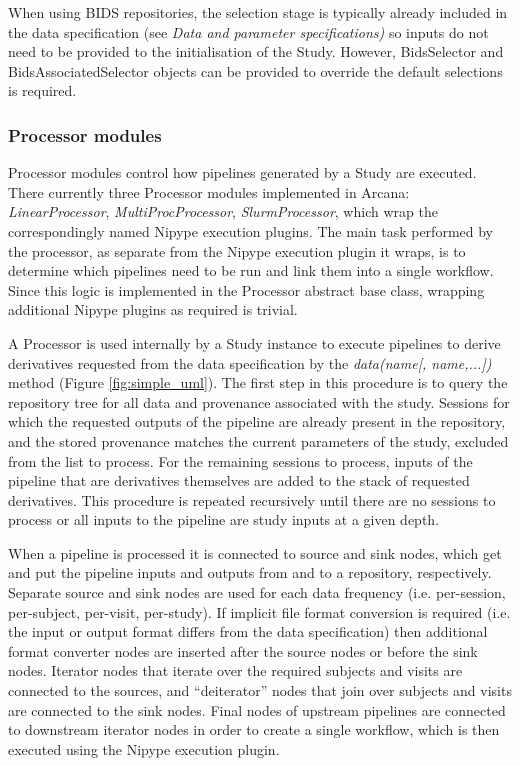 \documentclass[smallextended]{svjour3}       %
\begin{document}
When using BIDS repositories, the selection stage is typically already
included in the data specification (see \emph{Data and parameter
specifications)} so inputs do not need to be provided to the
initialisation of the Study. However, BidsSelector and
BidsAssociatedSelector objects can be provided to override the default
selections is required.

\subsubsection*{Processor modules}
\label{processor-modules}

Processor modules control how pipelines generated by a Study
are executed. There currently three Processor modules implemented in
Arcana: \emph{LinearProcessor}, \emph{MultiProcProcessor},
\emph{SlurmProcessor}, which wrap the
correspondingly named Nipype execution plugins. The main task performed
by the processor, as separate from the Nipype execution plugin it wraps,
is to determine which pipelines need to be run and link them into a
single workflow. Since this logic is implemented in the Processor
abstract base class, wrapping additional Nipype plugins as required is
trivial.

A Processor is used internally by a Study instance to execute pipelines
to derive derivatives requested from the data specification by the
\emph{data(name{[}, name,...{]})} method (Figure \ref{fig:simple_uml}). The first
step in this procedure is to query the repository tree for all data and
provenance associated with the study. Sessions for which the requested
outputs of the pipeline are already present in the repository, and the stored
provenance matches the current parameters of the study,
excluded from the list to process. For the remaining sessions to
process, inputs of the pipeline that are derivatives themselves are
added to the stack of requested derivatives. This procedure is repeated
recursively until there are no sessions to process or all inputs to the
pipeline are study inputs at a given depth.

When a pipeline is processed it is connected to source and
sink nodes, which get and put the pipeline inputs and outputs
from and to a repository, respectively. Separate source and sink nodes
are used for each data frequency (i.e. per-session, per-subject,
per-visit, per-study). If implicit file format conversion is required
(i.e. the input or output format differs from the data specification)
then additional format converter nodes are inserted after the source
nodes or before the sink nodes. Iterator nodes that iterate over the
required subjects and visits are connected to the sources, and ``deiterator''
nodes that join over subjects and visits are connected to the sink
nodes. Final nodes of upstream pipelines are connected to downstream
iterator nodes in order to create a single workflow, which is then executed using
the Nipype execution plugin.
\end{document}
